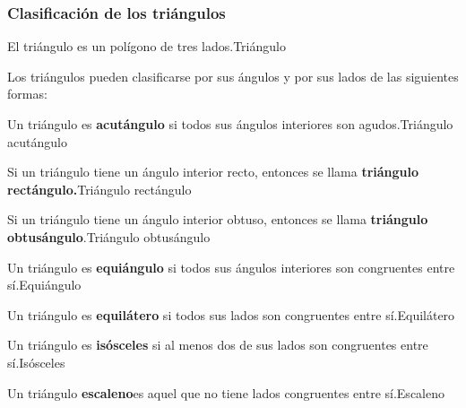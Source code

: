 \subsubsection{Clasificaci\'on de los tri\'angulos}
\begin{definicion}{El tri\'angulo es un pol\'igono de tres lados.}{Tri\'angulo}
\end{definicion}
Los tri\'angulos pueden clasificarse por sus \'angulos y por sus lados de las
si\-guien\-tes formas:
\begin{definicion}{Un tri\'angulo es \textbf{acut\'angulo} si todos sus
\'angulos interiores son agudos.}{Tri\'angulo acut\'angulo}
\end{definicion}
\begin{definicion}{Si un tri\'angulo tiene un \'angulo interior recto, entonces
se llama \textbf{tri\'angulo rect\'angulo.}}{Tri\'angulo rect\'angulo}
\end{definicion}
\begin{definicion}{Si un tri\'angulo tiene un \'angulo interior obtuso, entonces
se llama \textbf{tri\'angulo obtus\'angulo}.}{Tri\'angulo obtus\'angulo}
\end{definicion}
\begin{definicion}{Un tri\'angulo es \textbf{equi\'angulo} si todos sus
\'angulos interiores son congruentes entre s\'i.}{Equi\'angulo}
\end{definicion}
\begin{definicion}{Un tri\'angulo es \textbf{equil\'atero} si todos sus lados
son congruentes entre s\'i.}{Equil\'atero}
\end{definicion}
\begin{definicion}{Un tri\'angulo es \textbf{is\'osceles} si al menos dos de sus
lados son congruentes entre s\'i.}{Is\'osceles}
\end{definicion}
\begin{definicion}{Un tri\'angulo \textbf{escaleno}es aquel que no tiene lados
congruentes entre s\'i.}{Escaleno}
\end{definicion}
